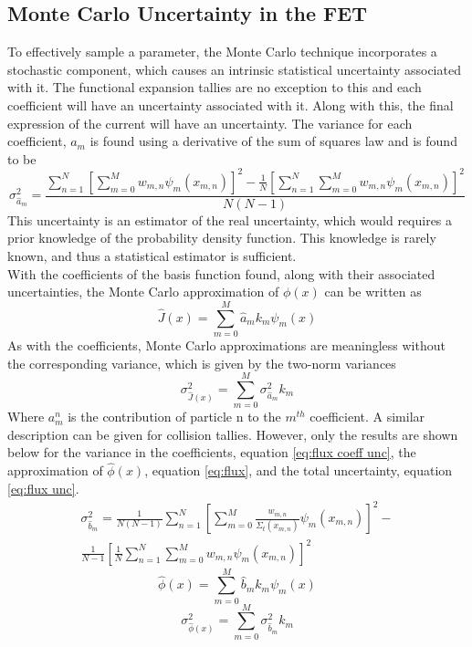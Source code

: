 \documentclass[10tma4paper]{article}
\begin{document}
\subsection{Monte Carlo Uncertainty in the FET}\label{UIC}

To effectively sample a parameter, the Monte Carlo technique incorporates a stochastic component, which causes an intrinsic statistical uncertainty associated with it. The functional expansion tallies are no exception to this and each coefficient will have an uncertainty associated with it. Along with this, the final expression of the current will have an uncertainty. The variance for each coefficient, $a_{m}$ is found using a derivative of the sum of squares law and is found to be 
	\begin{equation} \label{eq:coeff unc}
	\sigma_{\hat{a}_{m}}^2 = \frac{\sum_{n=1}^{N}[\sum_{m=0}^{M}w_{m,n}\psi_{m}(x_{m,n})]^{2} - \frac{1}{N}[ \sum_{n=1}^{N}\sum_{m=0}^{M}w_{m,n}\psi_{m}(x_{m,n})]^{2}}{N(N-1)}
	\end{equation}
This uncertainty is an estimator of the real uncertainty, which would requires a prior knowledge of the probability density function. This knowledge is rarely known, and thus a statistical estimator is sufficient.
\\With the coefficients of the basis function found, along with their associated uncertainties, the Monte Carlo approximation of $\phi(x)$ can be written as
	\begin{equation} \label{eq:current hat}
	\hat{J}(x) = \sum_{m=0}^{M} \hat{a}_{m}k_{m}\psi_{m}(x)
	\end{equation}
As with the coefficients, Monte Carlo approximations are meaningless without the corresponding variance, which is given by the two-norm variances
	\begin{equation} \label{eq:current unc}
	\sigma_{\hat{J}(x)}^2=\sum_{m=0}^{M}\sigma_{\hat{a}_{m}}^2k_{m}
	\end{equation}
Where $a_{m}^{n}$ is the contribution of particle n to the $m^{th}$ coefficient. A similar description can be given for collision tallies. However, only the results are shown below for the variance in the coefficients, equation \eqref{eq:flux coeff unc}, the approximation of $\hat{\phi}(x)$, equation \eqref{eq:flux}, and the total uncertainty, equation \eqref{eq:flux unc}.
		\begin{equation} \label{eq:flux coeff unc}
		\begin{split}	
		\sigma_{\hat{b}_{m}}^2 = \frac{1}{N(N-1)} \sum_{n=1}^{N}[\sum_{m=0}^{M}\frac{w_{m,n}}{\Sigma_{t}(x_{m,n})}\psi_{m}(x_{m,n})]^{2} - \\
		\frac{1}{N-1}[\frac{1}{N} \sum_{n=1}^{N}\sum_{m=0}^{M}w_{m,n}\psi_{m}(x_{m,n})]^{2}
		\end{split}	
		\end{equation}
		\begin{equation} \label{eq:flux}
		\hat{\phi}(x)= \sum_{m=0}^{M}\hat{b}_{m}k_{m}\psi_{m}(x)
		\end{equation}
		\begin{equation} \label{eq:flux unc}
		\sigma_{\hat{\phi}(x)}^2=\sum_{m=0}^{M}\sigma_{\hat{b}_{m}}^2k_{m}
		\end{equation}
\end{document}

